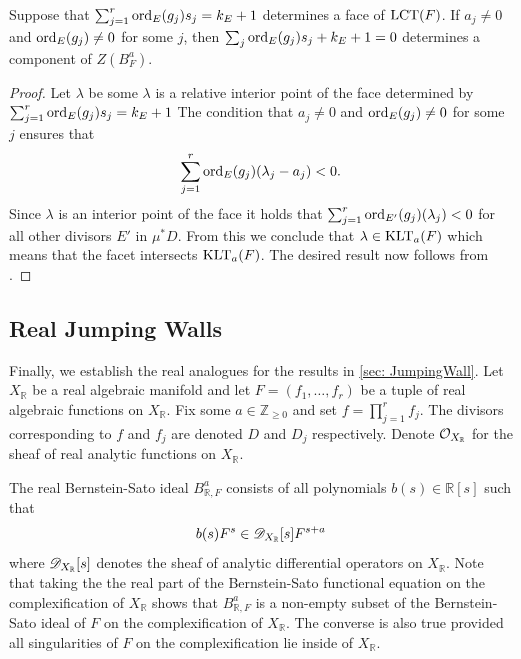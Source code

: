 \begin{corollary}\label{cor: LCT}
  Suppose that $\sum_{j=1}^r \operatorname{ord}_E(g_j)s_j = k_E + 1$ determines a face of $\operatorname{LCT}(F)$. If $a_j\neq 0$ and $\operatorname{ord}_{E}(g_j)\neq 0$ for some $j$, then $\sum_j \operatorname{ord}_{E}(g_j)s_j +k_E + 1=0$ determines a component of $Z(B_F^a)$.
\end{corollary}
\begin{proof}
  Let $\lambda$ be some $\lambda$ is a relative interior point of the face determined by $\sum_{j=1}^r \operatorname{ord}_E(g_j)s_j = k_E + 1$
  The condition that $a_j\neq 0$ and $\operatorname{ord}_{E}(g_j)\neq 0$ for some $j$ ensures that
  $$\sum_{j=1}^r \operatorname{ord}_{E}(g_j)(\lambda_j - a_j) < 0. $$
  Since $\lambda$ is an interior point of the face it holds that $\sum_{j=1}^r \operatorname{ord}_{E'}(g_j)(\lambda_j) < 0$ for all other divisors $E'$ in $\mu^*D$.
  From this we conclude that $\lambda \in \operatorname{KLT}_a(F)$ which means that the facet intersects $\operatorname{KLT}_a(F)$.
  The desired result now follows from .
\end{proof}
\subsection{Real Jumping Walls}\label{sec: RealJump}
Finally, we establish the real analogues for the results in \cref{sec: JumpingWall}.
Let $X_\mathbb{R}$ be a real algebraic manifold and let $F = (f_1,\ldots,f_r)$ be a tuple of real algebraic functions on $X_{\mathbb{R}}$.
Fix some $a\in \mathbb{Z}_{\geq 0}$ and set $f = \prod_{j=1}^r f_j$.
The divisors corresponding to $f$ and $f_j$ are denoted $D$ and $D_j$ respectively.
Denote $\mathcal{O}_{X_\mathbb{R}}$ for the sheaf of real analytic functions on $X_\mathbb{R}$.

The real Bernstein-Sato ideal $B_{\mathbb{R},F}^a$ consists of all polynomials $b(s)\in \mathbb{R}[s]$ such that
$$b(s)F^s \in \mathscr{D}_{X_\mathbb{R}}[s]F^{s+a}$$
where $\mathscr{D}_{X_\mathbb{R}}[s]$ denotes the sheaf of analytic differential operators on $X_\mathbb{R}$.
Note that taking the the real part of the Bernstein-Sato functional equation on the complexification of $X_\mathbb{R}$ shows that $B_{\mathbb{R},F}^a$ is a non-empty subset of the Bernstein-Sato ideal of $F$ on the complexification of $X_\mathbb{R}$.
The converse is also true provided all singularities of $F$ on the complexification lie inside of $X_\mathbb{R}$.

